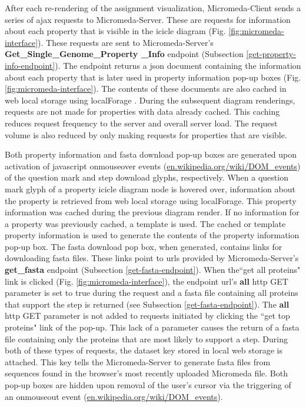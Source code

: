 After each re-rendering of the assignment visualization, Micromeda-Client sends 
a series of \gls{ajax}  requests to Micromeda-Server. These are requests for 
information about each property that is visible in the icicle diagram (Fig. 
\ref{fig:micromeda-interface}). These requests are sent to Micromeda-Server's 
\textbf{Get\_Single\_Genome\_Property \_Info} endpoint (Subsection 
\ref{get-property-info-endpoint}). The endpoint returns a \gls{json} document 
containing the information about each property that is later used in property 
information pop-up boxes (Fig. \ref{fig:micromeda-interface}). The contents of 
these documents are also cached in web local storage using localForage 
\cite{localforage}. During the subsequent diagram renderings, requests are not 
made for properties with data already cached. This caching reduces request 
frequency to the server and overall server load. The request volume is also 
reduced by only making requests for properties that are visible.

Both property information and \gls{fasta} download pop-up boxes are generated upon 
activation of \gls{javascript} onmouseover events \cite{dom-events} 
(\href{http://en.wikipedia.org/wiki/DOM_events}{en.wikipedia.org/wiki/DOM\_events}) 
of the question mark and step download glyphs, respectively. When a question 
mark glyph of a property icicle diagram node is hovered over, information about 
the property is retrieved from web local storage using localForage. This 
property information was cached during the previous diagram render. If no 
information for a property was previously cached, a template is used. The cached 
or template property information is used to generate the contents of the 
property information pop-up box. The \gls{fasta} download pop box, when generated, 
contains links for downloading \gls{fasta} files. These links point to \gls{url}s 
provided by Micromeda-Server's \textbf{get\_fasta} endpoint (Subsection 
\ref{get-fasta-endpoint}). When the``get all proteins" link is clicked (Fig. 
\ref{fig:micromeda-interface}), the endpoint \gls{url}'s \textbf{all} \gls{http} 
GET parameter is set to true during the request and a \gls{fasta} file containing all 
proteins that support the step is returned (see Subsection 
\ref{get-fasta-endpoint}). The \textbf{all} \gls{http} GET parameter is not 
added to requests initiated by clicking the ``get top proteins" link of the 
pop-up. This lack of a parameter causes the return of a \gls{fasta} file containing 
only the proteins that are most likely to support a step. During both of these 
types of requests, the dataset key stored in local web storage is attached. This 
key tells the Micromeda-Server to generate \gls{fasta} files from sequences found in 
the browser's most recently uploaded Micromeda file. Both pop-up boxes are hidden 
upon removal of the user's cursor via the triggering of an onmouseout event 
\cite{dom-events} 
(\href{http://en.wikipedia.org/wiki/DOM_events}{en.wikipedia.org/wiki/DOM\_events}).


